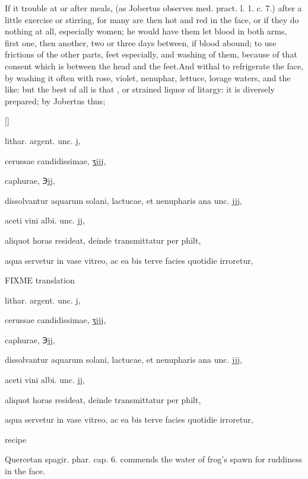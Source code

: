 If it trouble at or after meals, (as Jobertus observes \textlatin{med.
pract. l. 1. c. 7.}) after a little exercise or stirring, for many are
then hot and red in the face, or if they do nothing at all, especially
women; he would have them let blood in both arms, first one, then
another, two or three days between, if blood abound; to use frictions
of the other parts, feet especially, and washing of them, because of
that consent which is between the head and the feet.And withal to
refrigerate the face, by washing it often with rose, violet, nenuphar,
lettuce, lovage waters, and the like: but the best of all is that , or strained liquor of litargy: it is diversely prepared; by
Jobertus thus;
%
\vspace{-\baselineskip}
\begin{Prescription}[H]
[\baselineskip]
\begin{prescriptionbox}{}{}
\item \textlatin{lithar. argent. unc. j},
\item \textlatin{cerussae candidissimae, ʒjjj},
\item \textlatin{caphurae, ℈jj},
\item \textlatin{dissolvantur aquarum solani, lactucae, et nenupharis ana unc. jjj},
\item \textlatin{aceti vini albi. unc. jj},
\item \textlatin{aliquot horas resideat, deinde transmittatur per philt},
\item \textlatin{aqua servetur in vase vitreo, ac ea bis terve facies quotidie irroretur},
\end{prescriptionbox}
\begin{prescriptionbox}{FIXME translation}{}
\item \textlatin{lithar. argent. unc. j},
\item \textlatin{cerussae candidissimae, ʒjjj},
\item \textlatin{caphurae, ℈jj},
\item \textlatin{dissolvantur aquarum solani, lactucae, et nenupharis ana unc. jjj},
\item \textlatin{aceti vini albi. unc. jj},
\item \textlatin{aliquot horas resideat, deinde transmittatur per philt},
\item \textlatin{aqua servetur in vase vitreo, ac ea bis terve facies quotidie irroretur},
\end{prescriptionbox}
\caption{ recipe}
\end{Prescription}%
%
\textlatin{Quercetan spagir. phar. cap. 6.}
commends the water of frog's spawn for ruddiness in the face.


